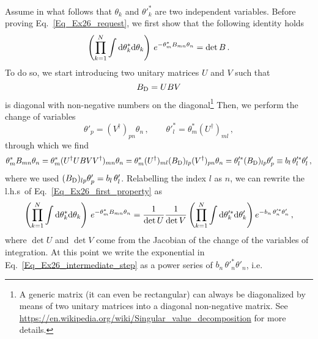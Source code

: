 \begin{sol}
    Assume in what follows that $\theta_k$ and $\theta'^{*}_k$ are two independent variables. Before proving Eq.~\eqref{Eq_Ex26_request}, we first show that the following identity holds
    \begin{equation}
        \left(\prod_{k=1}^{N} \int {\rm d} \theta_k^{*} {\rm d} \theta_k \right) \, e^{-\theta_{m}^{*}B_{mn}\theta_{n}} = \det B \, .
        \label{Eq_Ex26_first_property}
    \end{equation}
    To do so, we start introducing two unitary matrices $U$ and $V$ such that
    \begin{equation}
        B_{\rm D} = U B V 
    \end{equation}
    is diagonal with non-negative numbers on the diagonal\footnote{A generic matrix (it can even be rectangular) can always be diagonalized by means of two unitary matrices into a diagonal non-negative matrix. See \url{https://en.wikipedia.org/wiki/Singular_value_decomposition} for more details.}
    Then, we perform the change of variables
    \begin{equation}
        \theta'_{p} = (V^\dagger)_{pn} \theta_{n} \, ,
        \qquad
        \theta'^{*}_{l} = \theta_{m}^{*} (U^\dagger)_{m l} \, ,
        \label{Eq_Ex26_change_variables}
    \end{equation}
    through which we find
    \begin{equation}
        \theta_{m}^{*} B_{mn} \theta_{n} 
        = \theta_{m}^{*} (U^\dagger U B V V^\dagger)_{mn}\theta_{n} 
        = \theta_{m}^{*} (U^\dagger)_{ml}  (B_{\rm D})_{lp} (V^\dagger)_{pn} \theta_{n} 
        = \theta'^{*}_l (B_{\rm D})_{lp} \theta'_p 
        \equiv b_l \, \theta'^{*}_l \theta'_l \, ,
    \end{equation}
    where we used $(B_{\rm D})_{lp} \theta'_p = b_l \, \theta'_l$. Relabelling the index $l$ as $n$, we can rewrite the l.h.s~of Eq.~\eqref{Eq_Ex26_first_property} as
    \begin{equation}
        \left(\prod_{k=1}^{N} \int {\rm d} \theta_k^{*} {\rm d} \theta_k \right) \, e^{-\theta_{m}^{*}B_{mn}\theta_{n}}
        = \frac{1}{\det U}\frac{1}{\det V} \left(\prod_{k=1}^{N} \int {\rm d} \theta_k'^{*} {\rm d}\theta'_k \right) e^{- b_{n}\, \theta'^{*}_{n} \theta'_{n}} \, ,
        \label{Eq_Ex26_intermediate_step}
    \end{equation}
    where $\det U$ and $\det V$ come from the Jacobian of the change of the variables of integration. At this point we write the exponential in Eq.~\eqref{Eq_Ex26_intermediate_step} as a power series of $b_n \, \theta'^{*}_{n} \theta'_{n}$, i.e.

\end{sol}
